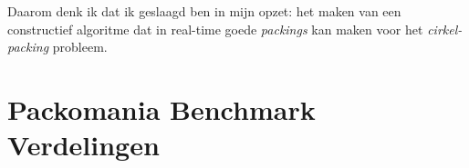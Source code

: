 \documentclass[12pt,a4paper,oneside]{book}
\begin{document}

Daarom denk ik dat ik geslaagd ben in mijn opzet: het maken van een constructief algoritme dat in real-time goede \textit{packings} kan maken voor het \textit{cirkel-packing} probleem.



\newpage






\appendix

\chapter{Packomania Benchmark Verdelingen} \label{append:packomania-benchmark-verdelingen}
\end{document}
